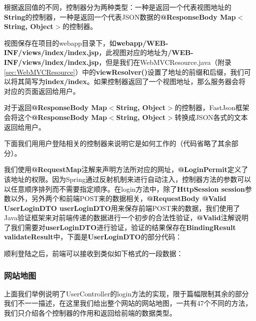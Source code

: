 根据返回值的不同，控制器分为两种类型：一种是返回一个代表视图地址的\textbf{String}的控制器，一种是返回一个代表JSON数据的\textbf{@ResponseBody Map$<$String, Object$>$}的控制器。

视图保存在项目的webapp目录下，如\textbf{webapp/WEB-INF/views/index/index.jsp}，此视图对应的地址为\textbf{/WEB-INF/views/index/index.jsp}，但是我们在WebMVCResource.java（附录\ref{sec:WebMVCResource}）中的\textbf{viewResolver()}设置了地址的前缀和后缀，我们可以将其简写为\textbf{index/index}。如果控制器返回了一个视图地址，那么服务器会将对应的页面返回给用户。

对于返回\textbf{@ResponseBody Map$<$String, Object$>$}的控制器，FastJson框架会将这个\textbf{@ResponseBody Map$<$String, Object$>$}转换成JSON各式的文本返回给用户。

下面我们用用户登陆相关的控制器来说明它是如何工作的（代码省略了其余部分）。



我们使用\textbf{@RequestMap}注解来声明方法所对应的网址，\textbf{@LoginPermit}定义了该地址的权限。因为Spring通过反射机制来进行自动注入，控制器方法的参数可以以任意顺序排列而不需要指定顺序。在login方法中，除了\textbf{HttpSession session}参数以外，另外两个和前端POST来的数据相关，\textbf{@RequestBody @Valid UserLoginDTO userLoginDTO}用来保存前端POST来的数据，我们使用了Java验证框架来对前端传递的数据进行一个初步的合法性验证，\textbf{@Valid}注解说明了我们需要对\textbf{userLoginDTO}进行验证，验证的结果保存在\textbf{BindingResult validateResult}中，下面是\textbf{UserLoginDTO}的部分代码：



顺利登陆之后，前端可以接收到类似如下格式的一段数据：



\subsubsection{网站地图}
上面我们举例说明了UserController的login方法的实现，限于篇幅限制其余的部分我们不一一描述，在这里我们给出整个网站的网站地图，一共有47个不同的方法，我们只介绍各个控制器的作用和返回给前端的数据类型。

